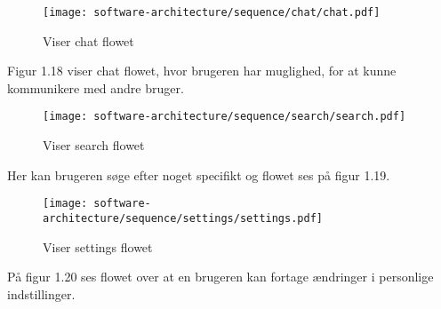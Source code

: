 \begin{figure}[ht]
    \centering
\texttt{[image: software-architecture/sequence/chat/chat.pdf]}
\caption{Viser chat flowet}
\label{fig:figure4}
\end{figure}
Figur 1.18 viser chat flowet, hvor brugeren har muglighed, for at kunne kommunikere med andre bruger.
\newpage
\begin{figure}[ht]
    \centering
\texttt{[image: software-architecture/sequence/search/search.pdf]}
\caption{Viser search flowet}
\label{fig:figure4}
\end{figure}
Her kan brugeren søge efter noget specifikt og flowet ses på figur 1.19.

\begin{figure}[ht]
    \centering
\texttt{[image: software-architecture/sequence/settings/settings.pdf]}
\caption{Viser settings flowet}
\label{fig:figure4}
\end{figure}
På figur 1.20 ses flowet over at en brugeren kan fortage ændringer i personlige indstillinger. 